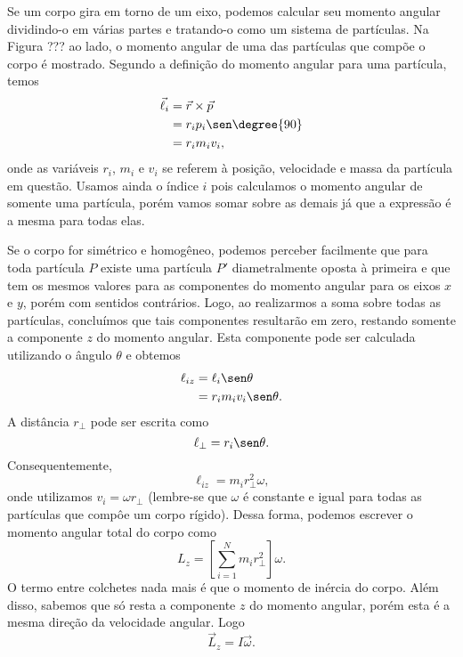 Se um corpo gira em torno de um eixo, podemos calcular seu momento angular dividindo-o em várias partes e tratando-o como um sistema de partículas. Na Figura ??? ao lado, o momento angular de uma das partículas que compõe o corpo é mostrado. Segundo a definição do momento angular para uma partícula, temos
\begin{align}
  \vec{\ell}_i &= \vec{r}\times\vec{p} \\
  &= r_i p_i \sen \degree{90} \\
  &= r_i m_i v_i,
\end{align}
%
onde as variáveis $r_i$, $m_i$ e $v_i$ se referem à posição, velocidade e massa da partícula em questão. Usamos ainda o índice $i$ pois calculamos o momento angular de somente uma partícula, porém vamos somar sobre as demais já que a expressão é a mesma para todas elas.

Se o corpo for simétrico e homogêneo, podemos perceber facilmente que para toda partícula $P$ existe uma partícula $P'$ diametralmente oposta à primeira e que tem os mesmos valores para as componentes do momento angular para os eixos $x$ e $y$, porém com sentidos contrários. Logo, ao realizarmos a soma sobre todas as partículas, concluímos que tais componentes resultarão em zero, restando somente a componente $z$ do momento angular. Esta componente pode ser calculada utilizando o ângulo $\theta$ e obtemos
\begin{align}
  \ell_{iz} &= \ell_i \sen\theta \\
  &= r_i m_i v_i \sen\theta.
\end{align}
%
A distância $r_{\perp}$ pode ser escrita como
\begin{equation}
  \ell_{\perp} = r_i\sen\theta.
\end{equation}
%
Consequentemente, 
\begin{equation}
  \ell_{iz} = m_i r_{\perp}^2 \omega,
\end{equation}
%
onde utilizamos $v_i = \omega r_{\perp}$ (lembre-se que $\omega$ é constante e igual para todas as partículas que compôe um corpo rígido). Dessa forma, podemos escrever o momento angular total do corpo como
\begin{equation}
  L_z = \left[\sum_{i=1}^N m_i r_{\perp}^2\right] \omega.
\end{equation}
%
O termo entre colchetes nada mais é que o momento de inércia do corpo. Além disso, sabemos que só resta a componente $z$ do momento angular, porém esta é a mesma direção da velocidade angular. Logo
\begin{equation}
  \vec{L}_z = I \vec{\omega}.
\end{equation}

